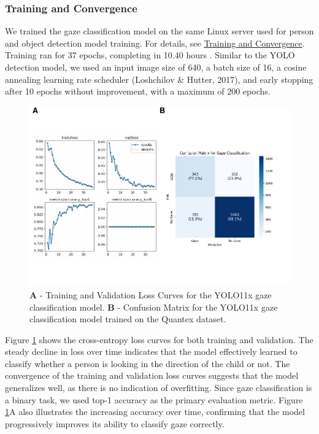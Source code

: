\documentclass[
  man,floatsintext]{apa6}
\begin{document}
\subsubsection{Training and Convergence}\label{training-and-convergence}

We trained the gaze classification model on the same Linux server used for person and object detection model training. For details, see \hyperref[sup-training-face]{Training and Convergence}. Training ran for 37 epochs, completing in 10.40 hours . Similar to the YOLO detection model, we used an input image size of 640, a batch size of 16, a cosine annealing learning rate scheduler (Loshchilov \& Hutter, 2017), and early stopping after 10 epochs without improvement, with a maximum of 200 epochs.

\begin{figure}

{\centering \includegraphics{Quantex_interaction_paper_files/figure-latex/gaze-loss-confusion-matrix-1} 

}

\caption{\textbf{A} - Training and Validation Loss Curves for the YOLO11x gaze classification model. \textbf{B} - Confusion Matrix for the YOLO11x gaze classification model trained on the Quantex dataset.}\label{fig:gaze-loss-confusion-matrix}
\end{figure}

Figure \ref{fig:gaze-loss-confusion-matrix} shows the cross-entropy loss curves for both training and validation. The steady decline in loss over time indicates that the model effectively learned to classify whether a person is looking in the direction of the child or not. The convergence of the training and validation loss curves suggests that the model generalizes well, as there is no indication of overfitting. Since gaze classification is a binary task, we used top-1 accuracy as the primary evaluation metric. Figure \ref{fig:gaze-loss-confusion-matrix}A also illustrates the increasing accuracy over time, confirming that the model progressively improves its ability to classify gaze correctly.
\end{document}
